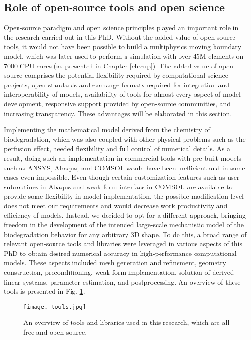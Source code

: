 \subsection{Role of open-source tools and open science} \label{sec:open_source}

Open-source paradigm and open science principles played an important role in the research carried out in this PhD. Without the added value of open-source tools, it would not have been possible to build a multiphysics moving boundary model, which was later used to perform a simulation with over 45M elements on 7000 \gls{CPU} cores (as presented in Chapter \ref{ch:cup}). The added value of open-source comprises the potential flexibility required by computational science projects, open standards and exchange formats required for integration and interoperability of models, availability of tools for almost every aspect of model development, responsive support provided by open-source communities, and increasing transparency. These advantages will be elaborated in this section.

Implementing the mathematical model derived from the chemistry of biodegradation, which was also coupled with other physical problems such as the perfusion effect, needed flexibility and full control of numerical details. As a result, doing such an implementation in commercial tools with pre-built models such as ANSYS, Abaqus, and COMSOL would have been inefficient and in some cases even impossible. Even though certain customization features such as user subroutines in Abaqus and weak form interface in COMSOL are available to provide some flexibility in model implementation, the possible modification level does not meet our requirements and would decrease work productivity and efficiency of models. Instead, we decided to opt for a different approach, bringing freedom in the development of the intended large-scale mechanistic model of the biodegradation behavior for any arbitrary 3D shape. To do this, a broad range of relevant open-source tools and libraries were leveraged in various aspects of this PhD to obtain desired numerical accuracy in high-performance computational models. These aspects included mesh generation and refinement, geometry construction, preconditioning, weak form implementation, solution of derived linear systems, parameter estimation, and postprocessing. An overview of these tools is presented in Fig. \ref{fig:conclusion_tools}.

\begin{figure}[h]
\centering
\medskip
\texttt{[image: tools.jpg]}
\caption[Overview of open-source tools and libraries used in this PhD]{An overview of tools and libraries used in this research, which are all free and open-source.} \label{fig:conclusion_tools}
\end{figure}

